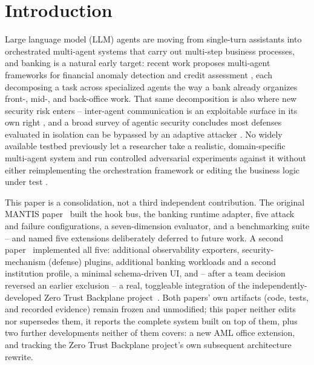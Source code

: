 \documentclass[conference]{IEEEtran}
\begin{document}
\section{Introduction}

Large language model (LLM) agents are moving from single-turn assistants into orchestrated multi-agent systems that carry out multi-step business processes, and banking is a natural early target: recent work proposes multi-agent frameworks for financial anomaly detection \cite{anomaly_detection_finance} and credit assessment \cite{masca_credit}, each decomposing a task across specialized agents the way a bank already organizes front-, mid-, and back-office work. That same decomposition is also where new security risk enters -- inter-agent communication is an exploitable surface in its own right \cite{prompt_infection, aitm_communication_attacks}, and a broad survey of agentic security concludes most defenses evaluated in isolation can be bypassed by an adaptive attacker \cite{agentic_security_survey, security_considerations_mas}. No widely available testbed previously let a researcher take a realistic, domain-specific multi-agent system and run controlled adversarial experiments against it without either reimplementing the orchestration framework or editing the business logic under test \cite{redagentbench}.

This paper is a consolidation, not a third independent contribution. The original MANTIS paper~\cite{mantis_paper1} built the hook bus, the banking runtime adapter, five attack and failure configurations, a seven-dimension evaluator, and a benchmarking suite -- and named five extensions deliberately deferred to future work. A second paper~\cite{mantis_paper2} implemented all five: additional observability exporters, security-mechanism (defense) plugins, additional banking workloads and a second institution profile, a minimal schema-driven UI, and -- after a team decision reversed an earlier exclusion -- a real, toggleable integration of the independently-developed Zero Trust Backplane project~\cite{ztb_repo}. Both papers' own artifacts (code, tests, and recorded evidence) remain frozen and unmodified; this paper neither edits nor supersedes them, it reports the complete system built on top of them, plus two further developments neither of them covers: a new AML office extension, and tracking the Zero Trust Backplane project's own subsequent architecture rewrite.
\end{document}

